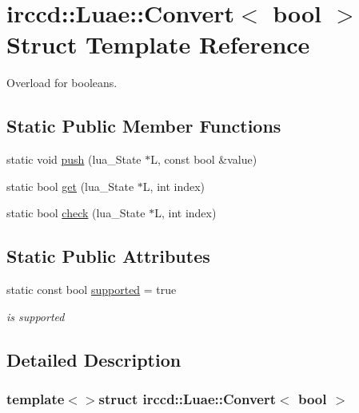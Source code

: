 \hypertarget{a00008}{\section{irccd\-:\-:Luae\-:\-:Convert$<$ bool $>$ Struct Template Reference}
\label{a00008}
}


Overload for booleans.  


\subsection*{Static Public Member Functions}
\begin{DoxyCompactItemize}
\item 
static void \hyperlink{a00008_a148aa5ba79c4ed99372778febc07eea9}{push} (lua\-\_\-\-State $\ast$L, const bool \&value)
\item 
static bool \hyperlink{a00008_a3a7231cc3d7ac0f57945754b156d8225}{get} (lua\-\_\-\-State $\ast$L, int index)
\item 
static bool \hyperlink{a00008_aa0f73c517e93d4d63e4cfb7f2a0fb810}{check} (lua\-\_\-\-State $\ast$L, int index)
\end{DoxyCompactItemize}
\subsection*{Static Public Attributes}
\begin{DoxyCompactItemize}
\item 
\hypertarget{a00008_afa56a96a098f0b4dfdbfbe5890801ff2}{static const bool \hyperlink{a00008_afa56a96a098f0b4dfdbfbe5890801ff2}{supported} = true}\label{a00008_afa56a96a098f0b4dfdbfbe5890801ff2}

\begin{DoxyCompactList}\small\item\em is supported \end{DoxyCompactList}\end{DoxyCompactItemize}


\subsection{Detailed Description}
\subsubsection*{template$<$$>$struct irccd\-::\-Luae\-::\-Convert$<$ bool $>$}

